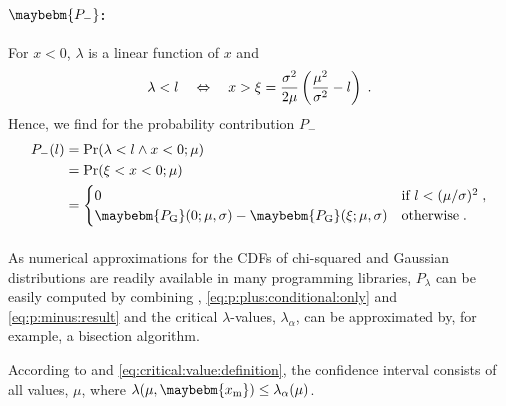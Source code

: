 \documentclass[a4paper]{article}
\newcommand*\PG{\maybebm{P_\mathrm{G}}\xspace}
\newcommand*\xm{\maybebm{x_{\mathrm{m}}}\xspace}
\begin{document}
\paragraph{$\maybebm{P_-}$:}
For $x<0$, $\lambda$ is a linear function of $x$ and
%
\begin{equation*}
  \lambda < l
  \quad \Leftrightarrow \quad
  x > \xi = \frac{\sigma^2}{2\mu} \left( \frac{\mu^2}{\sigma^2} - l \right)
  \;.
\end{equation*}
%
Hence, we find for the probability contribution $P_-$
%
\begin{align}
  P_-(l)
  & =
  \Pr(\lambda < l \wedge x < 0; \mu)
  \nonumber
  \\
  & =
  \Pr(\xi < x < 0; \mu)
  \nonumber
  \\
  & =
  \begin{cases}
    \displaystyle
    0 & \text{if } l < (\mu/\sigma)^2 \fcomma \\
    \displaystyle
    \PG(0; \mu, \sigma) - \PG(\xi; \mu, \sigma) & \text{otherwise} \fstop
  \end{cases}
  \label{eq:p:minus:result}
\end{align}
%

\paragraph{}
As numerical approximations for the CDFs of chi-squared and Gaussian
distributions are readily available in many programming libraries,
$P_\lambda$ can be easily computed by combining ,
\eqref{eq:p:plus:conditional:only} and \eqref{eq:p:minus:result} and the
critical $\lambda$-values, $\lambda_\alpha$, can be approximated by, for
example, a bisection algorithm.

According to  and
\eqref{eq:critical:value:definition}, the confidence interval consists
of all values, $\mu$, where $\lambda(\mu,\xm) \leq \lambda_\alpha(\mu)$.

\printbibliography[heading=bibintoc]
\end{document}
